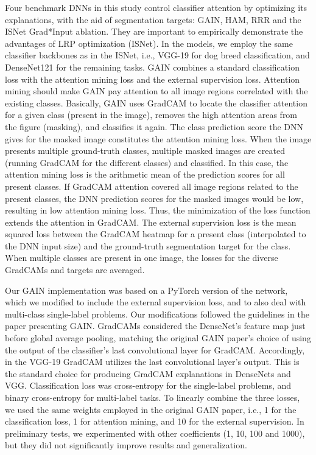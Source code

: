 \documentclass[fleqn,10pt]{wlscirep}
\begin{document}
{Four benchmark DNNs in this study control classifier attention by optimizing its explanations, with the aid of segmentation targets: GAIN, HAM, RRR and the ISNet Grad*Input ablation. They are important to empirically demonstrate the advantages of LRP optimization (ISNet). In the models, we employ the same classifier backbones as in the ISNet, i.e., VGG-19 for dog breed classification, and DenseNet121 for the remaining tasks. GAIN combines a standard classification loss with the attention mining loss and the external supervision loss\cite{GAIN}. Attention mining should make GAIN pay attention to all image regions correlated with the existing classes. Basically, GAIN uses GradCAM to locate the classifier attention for a given class (present in the image), removes the high attention areas from the figure (masking), and classifies it again. The class prediction score the DNN gives for the masked image constitutes the attention mining loss. When the image presents multiple ground-truth classes, multiple masked images are created (running GradCAM for the different classes) and classified. In this case, the attention mining loss is the arithmetic mean of the prediction scores for all present classes. If GradCAM attention covered all image regions related to the present classes, the DNN prediction scores for the masked images would be low, resulting in low attention mining loss. Thus, the minimization of the loss function extends the attention in GradCAM. The external supervision loss is the mean squared loss between the GradCAM heatmap for a present class (interpolated to the DNN input size) and the ground-truth segmentation target for the class. When multiple classes are present in one image, the losses for the diverse GradCAMs and targets are averaged.

Our GAIN implementation was based on a PyTorch version of the network\cite{GAINTorch}, which we modified to include the external supervision loss, and to also deal with multi-class single-label problems. Our modifications followed the guidelines in the paper presenting GAIN\cite{GAIN}. GradCAMs considered the DenseNet's feature map just before global average pooling, matching the original GAIN paper's choice of using the output of the classifier's last convolutional layer for GradCAM. Accordingly, in the VGG-19 GradCAM utilizes the last convolutional layer's output. This is the standard choice for producing GradCAM explanations in DenseNets and VGG. Classification loss was cross-entropy for the single-label problems, and binary cross-entropy for multi-label tasks. To linearly combine the three losses, we used the same weights employed in the original GAIN paper\cite{GAIN}, i.e., 1 for the classification loss, 1 for attention mining, and 10 for the external supervision. In preliminary tests, we experimented with other coefficients (1, 10, 100 and 1000), but they did not significantly improve results and generalization.

}
\end{document}
